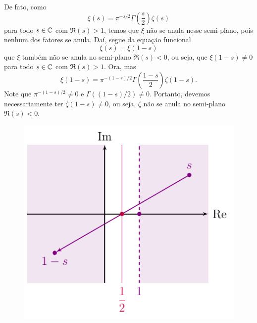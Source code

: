     De fato, como
    \[
    \xi(s) = \pi^{-s/2}\Gamma\left(\frac{s}{2}\right)\zeta(s)
    \]
    para todo $s\in\mathbb{C}$ com $\Re(s)>1$, temos que $\xi$ não se anula nesse semi-plano,
    pois nenhum dos fatores se anula. Daí, segue da equação funcional
    \[
    \xi(s) = \xi(1-s)
    \]
    que $\xi$ também não se anula no semi-plano $\Re(s) < 0$, ou seja, que $\xi(1-s)\neq 0$
    para todo $s\in\mathbb{C}$ com $\Re(s)>1$. Ora, mas
    \[
    \xi(1-s) = \pi^{-(1-s)/2}\Gamma\left(\frac{1-s}{2}\right)\zeta(1-s).
    \]
    Note que $\pi^{-(1-s)/2}\neq 0$ e $\Gamma((1-s)/2)\neq 0$. Portanto, devemos
    necessariamente ter $\zeta(1-s)\neq 0$, ou seja, $\zeta$ não se anula no
    semi-plano $\Re(s) < 0$.
    \begin{figure}[H]\centering
        \includegraphics{Figuras/espelho de s.pdf}
    \end{figure}
    \begin{center}
        
    \end{center}
    
    
